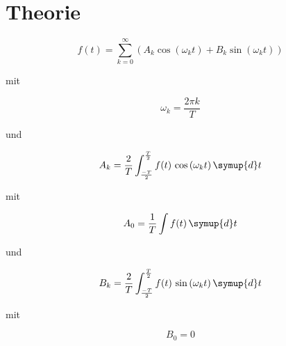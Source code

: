 \section{Theorie}
\label{sec:Theorie}

\begin{equation}
    \label{eq:Fouriersynthese}
    f (t) = \sum_{k=0}^\infty \left(A_k \cos \left( \omega _k t \right) + B_k \sin \left( \omega _k t \right) \right)
\end{equation}

mit

\begin{equation}
    \label{eq:Omega}
    \omega _k = \frac {2 \pi k}{T}
\end{equation}

und

\begin{equation}
    \label{eq:A_k}
    A_k = \frac{2}{T} \int_{\frac{-T}{2}}^{\frac{T}{2}} f(t) \, \cos \left( \omega _k t \right)  \symup{d}t
\end{equation}

mit

\begin{equation}
    \label{eq:A_0}
    A_0 = \frac{1}{T} \int f (t) \, \symup{d}t
\end{equation}

und

\begin{equation}
    \label{eq:B_k}
    B_k = \frac{2}{T} \int_{\frac{-T}{2}}^{\frac{T}{2}} f(t) \, \sin \left( \omega _k t \right)  \symup{d}t
\end{equation}

mit

\begin{equation}
    \label{eq:B_0}
    B_0 = 0
\end{equation}

\cite{sample}
